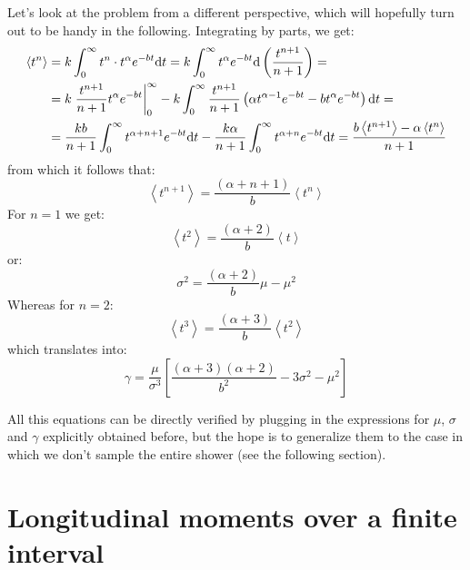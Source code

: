 \documentclass[a4paper,11pt]{article}
\begin{document}
Let's look at the problem from a different perspective, which will hopefully
turn out to be handy in the following. Integrating by parts, we get:
\begin{align*}
\left< t^n \right> & = k \int_{0}^\infty t^n \cdot t^\alpha e^{-bt} {\rm d}t =
k \int_{0}^\infty t^\alpha e^{-bt} {\rm d}\left(\frac{t^{n+1}}{n+1}\right) =\\
&= k\left.\frac{t^{n+1}}{n+1}  t^\alpha e^{-bt}\right|_0^\infty -
k \int_0^\infty \frac{t^{n+1}}{n+1} \left(
\alpha t^{\alpha - 1}e^{-bt} - bt^\alpha e^{-bt}
\right) {\rm d}t =\\
&= \frac{kb}{n+1} \int_{0}^\infty  t^{\alpha + n + 1} e^{-bt} {\rm d}t -
\frac{k\alpha}{n+1} \int_{0}^\infty  t^{\alpha + n} e^{-bt} {\rm d}t =
\frac{b \left< t^{n+1} \right> - \alpha\left< t^n \right>}{n+1}
\end{align*}
from which it follows that:
\begin{equation}
\left< t^{n+1} \right> = \frac{(\alpha + n + 1)}{b}\left< t^n \right>
\end{equation}
For $n = 1$ we get:
$$
\left< t^2 \right> = \frac{(\alpha + 2)}{b}\left< t \right>
$$
or:
\begin{equation}
\sigma^2 = \frac{(\alpha + 2)}{b}\mu - \mu^2
\end{equation}
Whereas for $n = 2$:
$$
\left< t^3 \right> = \frac{(\alpha + 3)}{b}\left< t^2 \right>
$$
which translates into:
\begin{equation}
\gamma = \frac{\mu}{\sigma^3}\left[
  \frac{(\alpha + 3)(\alpha + 2)}{b^2} - 3\sigma^2 - \mu^2
  \right]
\end{equation}

All this equations can be directly verified by plugging in the expressions
for $\mu$, $\sigma$ and $\gamma$ explicitly obtained before, but the hope is
to generalize them to the case in which we don't sample the entire shower
(see the following section).


\section{Longitudinal moments over a finite interval}
\end{document}
